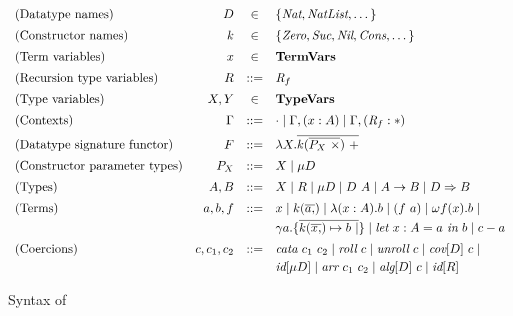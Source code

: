 \documentclass[pdflatex,sn-mathphys-num]{sn-jnl}%
\theoremstyle{thmstyleone}%
\theoremstyle{thmstyletwo}%
\theoremstyle{thmstylethree}%
\begin{document}
\begin{figure}[tb]
  \centering

  \begin{align*}
    \begin{array}{lrcl}
      \text{(Datatype names)} &
      D &\in& \{ \textit{Nat}, \textit{NatList}, \dots \}
      \\[0.5em]
      \text{(Constructor names)} &
      k &\in& \{ \textit{Zero}, \textit{Suc}, \textit{Nil}, \textit{Cons}, \dots \}
      \\[0.5em]
      \text{(Term variables)} &
      x &\in& \textbf{TermVars}
      \\[0.5em]
      \text{(Recursion type variables)} &
      R &::=& \textit{R}_{f}
      \\[0.5em]
      \text{(Type variables)} &
      X, Y &\in& \textbf{TypeVars}
      \\[0.5em]
      \text{(Contexts)} &
      \Gamma
      &::=&
      \cdot \mid
      \Gamma , (x : A) \mid
      \Gamma , (\textit{R}_{f} : \ast)
      \\[0.5em]
      \text{(Datatype signature functor)} &
      F &::=& \lambda X . \overline{k(\overline{P_X ~\times}) ~+}
      \\[0.5em]
      \text{(Constructor parameter types)} &
      P_X &::=&
      X \mid
      \mu D
      \\[0.5em]
      \text{(Types)} &
      A, B
      & ::= &
      X \mid
      R \mid
      \mu D \mid
      D ~ A \mid
      A \to B \mid
      D \Rightarrow B
      \\[0.5em]
      \text{(Terms)} &
      a, b, f
      & ::= &
      x \mid
      k(\overline{a ,}) \mid
      \lambda (x : A) . b \mid
      (f ~ a) \mid
      \omega f(x) . b \mid
      \\[0.25em] &&&
      \gamma a . \{ \overline{k(\overline{x ,}) \mapsto b ~|} \} \mid
      \textit{let}~ x : A = a ~\textit{in}~ b \mid
      c - a
      \\[0.5em]
      \text{(Coercions)} &
      c, c_1, c_2
      & ::= &
      \textit{cata}~ c_1 ~ c_2 \mid
      \textit{roll}~ c \mid
      \textit{unroll}~ c \mid
      \textit{cov}[D] ~ c \mid
      \\[0.25em] &&&
      \textit{id}[\mu D] \mid
      \textit{arr}~ c_1 ~ c_2 \mid
      \textit{alg}[D] ~ c \mid
      \textit{id}[R]
    \end{array}
  \end{align*}
\caption{Syntax of \lcata}
\label{fig:syntax}
\end{figure}
\end{document}
